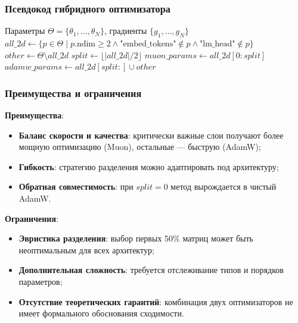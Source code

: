 \documentclass[a4paper,12pt]{article}
\begin{document}
\subsubsection{Псевдокод гибридного оптимизатора}

\begin{algorithm}[H]
\caption{Hybrid: комбинированное обновление всех параметров}
\label{alg:hybrid}
\begin{algorithmic}[1]
\Require Параметры $\Theta = \{\theta_1, \ldots, \theta_N\}$, градиенты $\{g_1, \ldots, g_N\}$
\State {}
\State $all\_2d \gets \{ p \in \Theta \mid p.\text{ndim} \ge 2 \land \text{"embed\_tokens"} \notin p \land \text{"lm\_head"} \notin p \}$
\State $other \gets \Theta \setminus all\_2d$
\State {}
\State $split \gets \lfloor |all\_2d| / 2 \rfloor$
\State $muon\_params \gets all\_2d[0:split]$
\State $adamw\_params \gets all\_2d[split:] \cup other$
\State {}
\State \Return {}
\end{algorithmic}
\end{algorithm}

\subsubsection{Преимущества и ограничения}

\textbf{Преимущества}:
\begin{itemize}
    \item \textbf{Баланс скорости и качества}: критически важные слои получают более мощную оптимизацию (Muon), остальные --- быструю (AdamW);
    \item \textbf{Гибкость}: стратегию разделения можно адаптировать под архитектуру;
    \item \textbf{Обратная совместимость}: при $split = 0$ метод вырождается в чистый AdamW.
\end{itemize}

\textbf{Ограничения}:
\begin{itemize}
    \item \textbf{Эвристика разделения}: выбор первых 50\% матриц может быть неоптимальным для всех архитектур;
    \item \textbf{Дополнительная сложность}: требуется отслеживание типов и порядков параметров;
    \item \textbf{Отсутствие теоретических гарантий}: комбинация двух оптимизаторов не имеет формального обоснования сходимости.
\end{itemize}
\newpage
\end{document}
